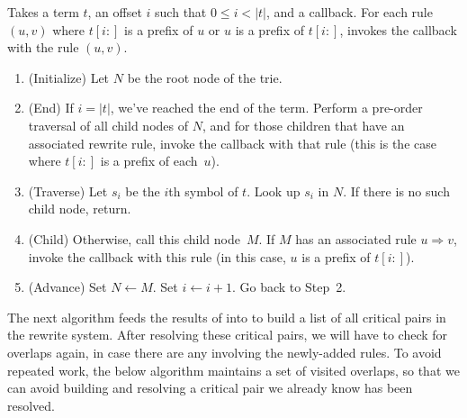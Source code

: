 \documentclass[../generics]{subfiles}
\begin{document}
\begin{algorithm}\label{overlap trie lookup}
Takes a term $t$, an offset $i$ such that $0\leq i<|t|$, and a callback. For each rule $(u, v)$ where $t[i:]$ is a prefix of $u$ or $u$ is a prefix of $t[i:]$, invokes the callback with the rule $(u, v)$.
\begin{enumerate}
\item (Initialize) Let $N$ be the root node of the trie.
\item (End) If $i=|t|$, we've reached the end of the term. Perform a pre-order traversal of all child nodes of $N$, and for those children that have an associated rewrite rule, invoke the callback with that rule (this is the case where $t[i:]$ is a prefix of each~$u$).
\item (Traverse) Let $s_i$ be the $i$th symbol of $t$. Look up $s_i$ in $N$. If there is no such child node, return.
\item (Child) Otherwise, call this child node~$M$. If $M$ has an associated rule $u\Rightarrow v$, invoke the callback with this rule (in this case, $u$ is a prefix of $t[i:]$).
\item (Advance) Set $N \leftarrow M$. Set $i \leftarrow i+1$. Go back to Step~2.
\end{enumerate}
\end{algorithm}

The next algorithm feeds the results of  into  to build a list of all critical pairs in the rewrite system. After resolving these critical pairs, we will have to check for overlaps again, in case there are any involving the newly-added rules. To avoid repeated work,  the below algorithm maintains a set of visited overlaps, so that we can avoid building and resolving a critical pair we already know has been resolved.
\end{document}
